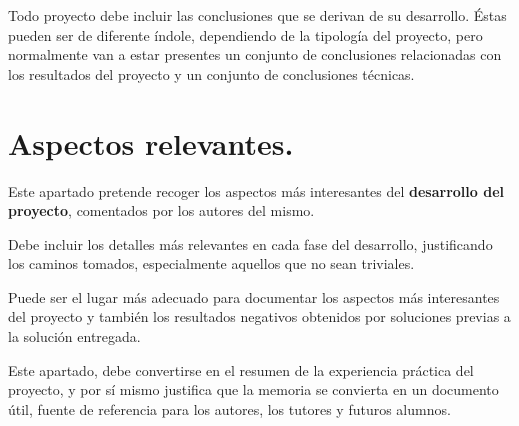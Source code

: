 
Todo proyecto debe incluir las conclusiones que se derivan de su desarrollo. Éstas pueden ser de diferente índole, dependiendo de la tipología del proyecto, pero normalmente van a estar presentes un conjunto de conclusiones relacionadas con los resultados del proyecto y un conjunto de conclusiones técnicas. 



\section{Aspectos relevantes.}

Este apartado pretende recoger los aspectos más interesantes del \textbf{desarrollo del proyecto}, comentados por los autores del mismo.

Debe incluir los detalles más relevantes en cada fase del desarrollo, justificando los caminos tomados, especialmente aquellos que no sean triviales. 

Puede ser el lugar más adecuado para documentar los aspectos más interesantes del proyecto y también los resultados negativos obtenidos por soluciones previas a la solución entregada.

Este apartado, debe convertirse en el resumen de la experiencia práctica del proyecto, y por sí mismo justifica que la memoria se convierta en un documento útil, fuente de referencia para los autores, los tutores y futuros alumnos.




